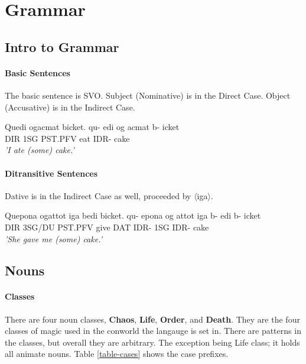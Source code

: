 \documentclass[11pt]{article}
\begin{document}
\newpage
\section{Grammar}

\subsection{Intro to Grammar}

\paragraph{Basic Sentences}
The basic sentence is SVO.
Subject (Nominative) is in the Direct Case.
Object (Accusative) is in the Indirect Case.

\begin{exe}
\ex \label{basicsentence}
Quedi ogacmat bicket.
\gll
qu-  edi og      acmat b-   icket\\
DIR  1SG PST.PFV eat   IDR- cake\\
\trans 
    \textit{'I ate (some) cake.'}\\
\end{exe}

\paragraph{Ditransitive Sentences}
Dative is in the Indirect Case as well, proceeded by $\langle$iga$\rangle$.

\begin{exe}
\ex \label{basicsentence}
Quepona ogattot iga bedi bicket.
\gll
qu-  epona  og      attot iga b-   edi b-   icket\\
DIR  3SG/DU PST.PFV give  DAT IDR- 1SG IDR- cake\\
\trans 
    \textit{'She gave me (some) cake.'}\\
\end{exe}


\subsection{Nouns}

\paragraph{Classes}
There are four noun classes,
\textbf{Chaos}, \textbf{Life}, \textbf{Order}, and \textbf{Death}.
They are the four classes of magic used in the conworld the langauge is set in.
There are patterns in the classes, but overall they are arbitrary.
The exception being Life class;
it holds all animate nouns.
Table \ref{table-cases} shows the case prefixes.
\end{document}

